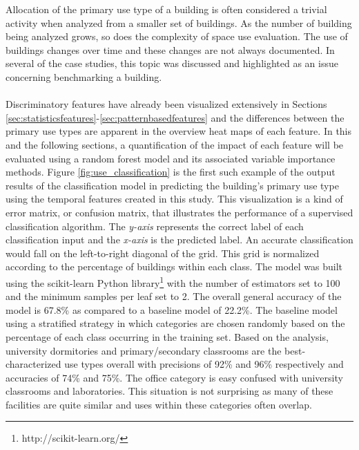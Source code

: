 Allocation of the primary use type of a building is often considered a trivial activity when analyzed from a smaller set of buildings. As the number of building being analyzed grows, so does the complexity of space use evaluation. The use of buildings changes over time and these changes are not always documented. In several of the case studies, this topic was discussed and highlighted as an issue concerning benchmarking a building.\\
\\
Discriminatory features have already been visualized extensively in Sections \ref{sec:statisticsfeatures}-\ref{sec:patternbasedfeatures} and the differences between the primary use types are apparent in the overview heat maps of each feature. In this and the following sections, a quantification of the impact of each feature will be evaluated using a random forest model and its associated variable importance methods. Figure \ref{fig:use_classification} is the first such example of the output results of the classification model in predicting the building's primary use type using the temporal features created in this study. This visualization is a kind of error matrix, or confusion matrix, that illustrates the performance of a supervised classification algorithm. The \emph{y-axis} represents the correct label of each classification input and the \emph{x-axis} is the predicted label. An accurate classification would fall on the left-to-right diagonal of the grid. This grid is normalized according to the percentage of buildings within each class. The model was built using the scikit-learn Python library\footnote{http://scikit-learn.org/} with the number of estimators set to 100 and the minimum samples per leaf set to 2. The overall general accuracy of the model is 67.8\% as compared to a baseline model of 22.2\%. The baseline model using a stratified strategy in which categories are chosen randomly based on the percentage of each class occurring in the training set. Based on the analysis, university dormitories and primary/secondary classrooms are the best-characterized use types overall with precisions of 92\% and 96\% respectively and accuracies of 74\% and 75\%. The office category is easy confused with university classrooms and laboratories. This situation is not surprising as many of these facilities are quite similar and uses within these categories often overlap. 

